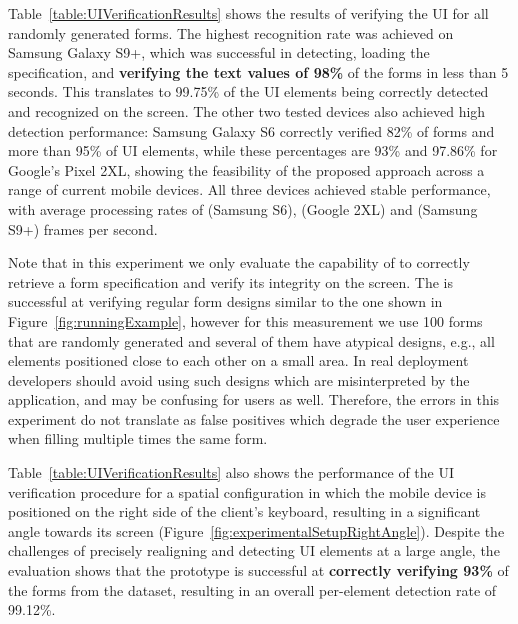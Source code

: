 Table~\ref{table:UIVerificationResults} shows the results of verifying the UI for all randomly generated forms. The highest recognition rate was achieved on Samsung Galaxy S9+, which was successful in detecting, loading the specification, and \textbf{verifying the text values of 98\%} of the forms in less than 5 seconds.
This translates to 99.75\% of the UI elements being correctly detected and recognized on the screen.
The other two tested devices also achieved high detection performance: Samsung Galaxy S6 correctly verified 82\% of forms and more than 95\% of UI elements, while these percentages are 93\% and 97.86\% for Google's Pixel 2XL, showing the feasibility of the proposed approach across a range of current mobile devices.
All three devices achieved stable performance, with average processing rates of  (Samsung S6),  (Google 2XL) and  (Samsung S9+) frames per second.

Note that in this experiment we only evaluate the capability of \sysname to correctly retrieve a form specification and verify its integrity on the screen. The \app is successful at verifying regular form designs similar to the one shown in Figure~\ref{fig:runningExample}, however for this measurement we use 100 forms that are randomly generated and several of them have atypical designs, e.g., all elements positioned close to each other on a small area.
In real deployment developers should avoid using such designs which are misinterpreted by the application, and may be confusing for users as well.
Therefore, the errors in this experiment do not translate as false positives which degrade the user experience when filling multiple times the same form.

Table~\ref{table:UIVerificationResults} also shows the performance of the UI verification procedure for a spatial configuration in which the mobile device is positioned on the right side of the client's keyboard, resulting in a significant angle towards its screen (Figure~\ref{fig:experimentalSetupRightAngle}).
Despite the challenges of precisely realigning and detecting UI elements at a large angle, the evaluation shows that the prototype is successful at \textbf{correctly verifying 93\%} of the forms from the dataset, resulting in an overall per-element detection rate of 99.12\%.

